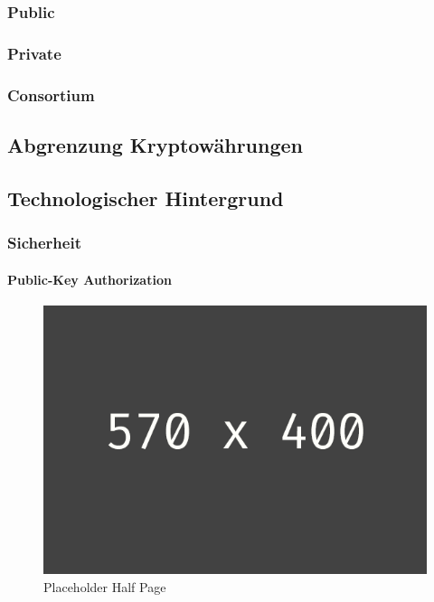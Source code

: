 \subsubsection{Public}


\subsubsection{Private}


\subsubsection{Consortium}


\subsection{Abgrenzung Kryptowährungen}


\subsection{Technologischer Hintergrund}


\subsubsection{Sicherheit} \label{tec_bkgrnd_sec}


\paragraph{Public-Key Authorization}
\begin{figure}[h!]
	\centering
	\includegraphics[width=1.0\linewidth]{pictures/placeholder_half_page}
	\caption[Placeholder Half Page]{Placeholder Half Page}
	\label{fig:placeholder_half_page}
\end{figure}



